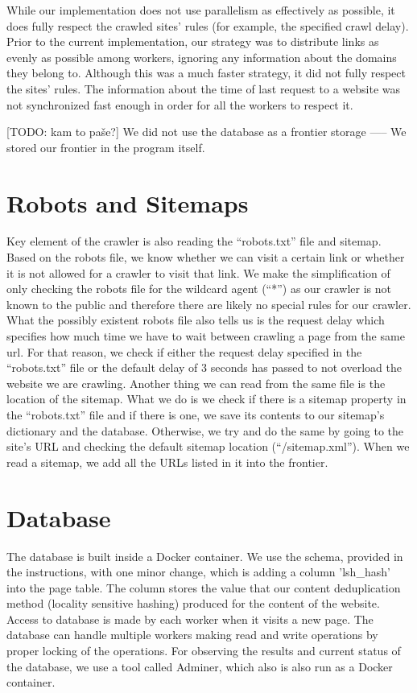 \documentclass[9pt]{IEEEtran}
\begin{document}
While our implementation does not use parallelism as effectively as possible, it does fully respect the crawled sites' rules (for example, the specified crawl delay).
Prior to the current implementation, our strategy was to distribute links as evenly as possible among workers, ignoring any information about the domains they belong to.
Although this was a much faster strategy, it did not fully respect the sites' rules.
The information about the time of last request to a website was not synchronized fast enough in order for all the workers to respect it.

[TODO: kam to paše?] We did not use the database as a frontier storage ----- We stored our frontier in the program itself.

\section{Robots and Sitemaps}
Key element of the crawler is also reading the ``robots.txt'' file and sitemap. 
Based on the robots file, we know whether we can visit a certain link or whether it is not allowed for a crawler to visit that link.
We make the simplification of only checking the robots file for the wildcard agent (``*'') as our crawler is not known to the public and therefore there are likely no special rules for our crawler.
What the possibly existent robots file also tells us is the request delay which specifies how much time we have to wait between crawling a page from the same url.
For that reason, we check if either the request delay specified in the ``robots.txt'' file or the default delay of 3 seconds has passed to not overload the website we are crawling.
Another thing we can read from the same file is the location of the sitemap.
What we do is we check if there is a sitemap property in the ``robots.txt'' file and if there is one, we save its contents to our sitemap's dictionary and the database. Otherwise, we try and do the same by going to the site's URL and checking the default sitemap location (``/sitemap.xml'').
When we read a sitemap, we add all the URLs listed in it into the frontier. 


\section{Database}\label{section:database}
The database is built inside a Docker container. 
We use the schema, provided in the instructions, with one minor change, which is adding a column 'lsh\_hash' into the page table. 
The column stores the value that our content deduplication method (locality sensitive hashing) produced for the content of the website. 
Access to database is made by each worker when it visits a new page. 
The database can handle multiple workers making read and write operations by proper locking of the operations.
For observing the results and current status of the database, we use a tool called Adminer, which also is also run as a Docker container.
\end{document}
